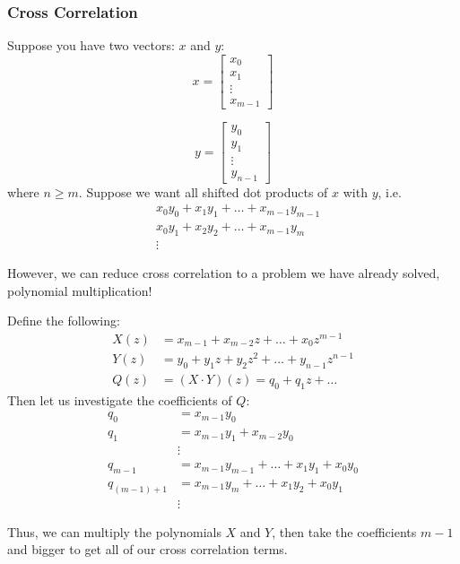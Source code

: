 \subsubsection{Cross Correlation}
Suppose you have two vectors: $x$ and $y$:
\[ x = \begin{bmatrix}
    x_0 \\ x_1 \\ \vdots \\ x_{m - 1}
\end{bmatrix} \]

\[ y = \begin{bmatrix}
    y_0 \\ y_1 \\ \vdots \\ y_{n - 1}
\end{bmatrix} \]
where $n \geq m$. Suppose we want all shifted dot products of $x$ with $y$, i.e.
\begin{align*}
    &x_0 y_0 + x_1 y_1 + \dots + x_{m - 1}y_{m - 1} \\
    &x_0 y_1 + x_2 y_2 + \dots + x_{m - 1}y_{m} \\
    &\vdots
\end{align*}

However, we can reduce cross correlation to a problem we have already solved, polynomial multiplication!

\begin{algothm} 
    Define the following:
    \begin{align*}
        X(z) &= x_{m - 1} + x_{m - 2}z + \dots + x_0 z^{m - 1} \\
        Y(z) &= y_0 + y_1 z + y_2 z^2 + \dots + y_{n - 1}z^{n - 1}\\
        Q(z) &= (X \cdot Y)(z) = q_0 + q_1z + \dots
    \end{align*}
    Then let us investigate the coefficients of $Q$:
    \begin{align*}
        q_0 &= x_{m - 1}y_0 \\
        q_1 &= x_{m - 1}y_1 + x_{m - 2}y_0 \\
        &\vdots \\
        q_{m - 1} &= x_{m - 1}y_{m - 1} + \dots + x_1 y_1 + x_0 y_0 \\
        q_{(m - 1) + 1} &= x_{m - 1}y_{m} + \dots + x_1 y_2 + x_0 y_1 \\
        &\vdots
    \end{align*}

    Thus, we can multiply the polynomials $X$ and $Y$, then take the coefficients
    $m - 1$ and bigger to get all of our cross correlation terms.
\end{algothm}
\endinput